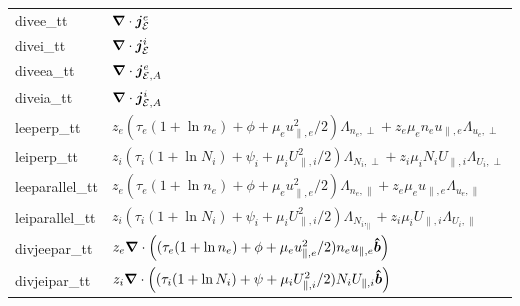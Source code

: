 \begin{longtable}{ll}
    divee\_tt &${\boldsymbol{\nabla}}\cdot {\boldsymbol{j}}_{\mathcal E}^e$ \\
    divei\_tt &${\boldsymbol{\nabla}}\cdot {\boldsymbol{j}}_{\mathcal E}^i$ \\
    diveea\_tt &${\boldsymbol{\nabla}}\cdot {\boldsymbol{j}}_{\mathcal E,A}^e$\\
    diveia\_tt &${\boldsymbol{\nabla}}\cdot {\boldsymbol{j}}_{\mathcal E,A}^i$\\
    leeperp\_tt &$z_e(\tau_e(1+\ln n_e) + \phi + \mu_eu_{\parallel,e}^2/2) \Lambda_{n_e,\perp} + z_e\mu_e n_e u_{\parallel,e} \Lambda_{u_e,\perp}$ \\
    leiperp\_tt &$z_i(\tau_i(1+\ln N_i) + \psi_i + \mu_iU_{\parallel,i}^2/2) \Lambda_{N_i,\perp} + z_i\mu_i N_i U_{\parallel,i} \Lambda_{U_i,\perp}$ \\
    leeparallel\_tt & $z_e(\tau_e(1+\ln n_e) + \phi + \mu_eu_{\parallel,e}^2/2) \Lambda_{n_e,\parallel} +
    z_e\mu_e u_{\parallel,e} \Lambda_{u_e, \parallel}$ \\
    leiparallel\_tt & $z_i(\tau_i(1+\ln N_i) + \psi_i + \mu_iU_{\parallel,i}^2/2)\Lambda_{N_i,_\parallel} +
    z_i\mu_i U_{\parallel,i} \Lambda_{U_i,\parallel}$ \\
    divjeepar\_tt &$ z_e{\boldsymbol{\nabla}}\cdot \left( (\tau_e(1+\ln n_e) + \phi + \mu_eu_{\parallel,e}^2/2) n_eu_{\parallel,e}\bm{\hat{b}}\right)$ \\
    divjeipar\_tt &$ z_i{\boldsymbol{\nabla}}\cdot \left( (\tau_i(1+\ln N_i) + \psi + \mu_iU_{\parallel,i}^2/2) N_iU_{\parallel,i}\bm{\hat{b}}\right)$ \\
\bottomrule
\end{longtable}

